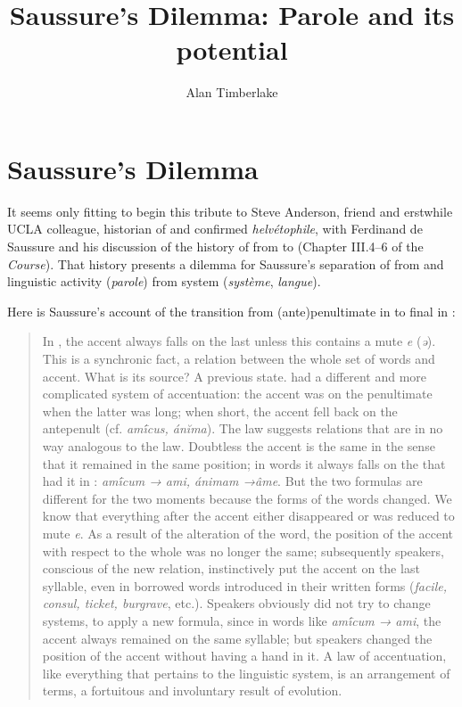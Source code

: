 \documentclass[output=paper,
modfonts
]{LSP/langsci}
\title{Saussure's Dilemma: Parole and its potential}
\author{%
Alan Timberlake\affiliation{Columbia University}
}
\begin{document}
\maketitle


\section{Saussure's Dilemma}\label{saussures-dilemma}

It seems only fitting to begin this tribute to Steve Anderson, friend
and erstwhile UCLA colleague, historian of  and confirmed
\emph{helvétophile}, with Ferdinand de Saussure and his discussion of
the history of  from  to  (Chapter III.4--6 of the
\emph{Course}). That history presents a dilemma for Saussure's
separation of  from  and linguistic activity
(\emph{parole}) from system (\emph{système}, \emph{langue}).

Here is Saussure's account of the transition from (ante)penultimate
 in  to final  in :

\begin{quote}
In , the accent always falls on the last  unless this
 contains a mute \emph{e} (\emph{ə}). This is a synchronic fact,
a relation between the whole set of  words and accent. What is its
source? A previous state.  had a different and more complicated
system of accentuation: the accent was on the penultimate  when
the latter was long; when short, the accent fell back on the antepenult
(cf. \emph{amī́cus, ánĭma}). The  law suggests relations that
are in no way analogous to the  law. Doubtless the accent is the
same in the sense that it remained in the same position; in  words
it always falls on the  that had it in : \textit{amī́cum → ami, ánimam →âme}. But the two formulas are
different for the two moments because the forms of the words changed. We
know that everything after the accent either disappeared or was reduced
to mute \emph{e}. As a result of the alteration of the word, the
position of the accent with respect to the whole was no longer the same;
subsequently speakers, conscious of the new relation, instinctively put
the accent on the last syllable, even in borrowed words introduced in
their written forms (\emph{facile, consul, ticket, burgrave}, etc.).
Speakers obviously did not try to change systems, to apply a new
formula, since in words like \emph{amī́cum → ami}, the accent
always remained on the same syllable; but speakers changed the position
of the accent without having a hand in it. A law of accentuation, like
everything that pertains to the linguistic system, is an arrangement of
terms, a fortuitous and involuntary result of evolution. \citep[86]{DESb}
\end{quote}
\end{document}

